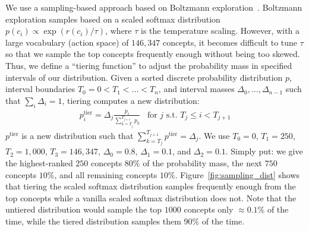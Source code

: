 We use a sampling-based approach based on Boltzmann exploration~\cite{sutton1991dyna}. Boltzmann exploration samples based on a scaled softmax distribution $ p(c_i) \propto \exp(r(c_i)/\tau)$, where  
$\tau$ is the temperature scaling.
However, with a large vocabulary (action space) of $146{,}347$ concepts, it becomes difficult to tune $\tau$ so that we sample the top concepts frequently enough without being too skewed. 
Thus, we define a ``tiering function'' to adjust the probability mass in specified intervals of our distribution. Given a sorted discrete probability distribution $p$, interval boundaries $T_0 =0 < T_1 < \dots < T_n$, and interval masses $\Delta_0, \dots, \Delta_{n-1}$ such that $\sum_i \Delta_i = 1$,  tiering computes a new distribution: 
\begin{align}
    p_i^{\text{tier}} = \Delta_j \frac{p_i}{\sum_{k=T_j}^{T_{j+1}} p_k} \;\;\; \text{for } j \text{  s.t.  }T_j \leq i < T_{j+1} 
\end{align}
$p^{\text{tier}}$ is a new distribution such that $\sum_{k=T_j}^{T_{j+1}} p^{\text{tier}} = \Delta_j$. We use $T_0=0$, $T_1=250$, $T_2=1{,}000$, $T_3=146{,}347$, $\Delta_0=0.8$, $\Delta_1 = 0.1$, and $\Delta_2=0.1$.
Simply put: we give the highest-ranked $250$ concepts $80\%$ of the probability mass, the next $750$ concepts $10\%$, and all remaining concepts $10\%$.
Figure~\ref{fig:sampling_dist} shows that tiering the scaled softmax distribution samples frequently enough from the top concepts while a vanilla scaled softmax distribution does not.
Note that the untiered distribution would sample the top $1000$ concepts only $\approx 0.1\%$ of the time, while the tiered distribution samples them $90\%$ of the time.


